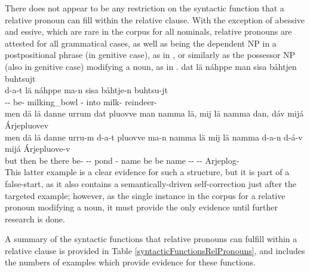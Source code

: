There does not appear to be any restriction on the syntactic function that a relative pronoun can fill within the relative clause. With the exception of abessive and essive, which are rare in the corpus for all nominals, relative pronouns are attested for all grammatical cases, as well as being the dependent NP in a postpositional phrase (in genitive case), as in , or similarly as the possessor NP (also in genitive case) modifying a noun, as in . 
\ea\label{relClause7}%
\glll	dat lä náhppe man sisa båhtjen buhtsujt\\
	d-a-t lä náhppe ma-n sisa båhtje-n buhtsu-jt\\
	-- be- milking\_bowl\BS{} - into milk- reindeer-\\\nopagebreak
{} 
\z
\ea\label{relClause8}%
\glll	men dä lä danne urrum dat pluovve man namma lä, mij lä namma dan, dáv mijá Árjepluovev\\
	men dä lä danne urru-m d-a-t pluovve ma-n namma lä mij lä namma d-a-n d-á-v mijá Árjepluove-v\\
	but then be\BS{} there be- -- pond\BS{} - name\BS{} be\BS{} \BS{} be\BS{} name\BS{} -- --  Arjeplog-\\\nopagebreak
{} 
\z
This latter example is a clear evidence for such a structure, but it is part of a false-start, as it also contains a semantically-driven self-correction just after the targeted example; however, as the single instance in the corpus for a relative pronoun modifying a noun, it must provide the only evidence until further research is done. 

A summary of the syntactic functions that relative pronouns can fulfill within a relative clause is provided in Table \vref{syntacticFunctionsRelPronouns}, and includes the numbers of examples which provide evidence for these functions. 

